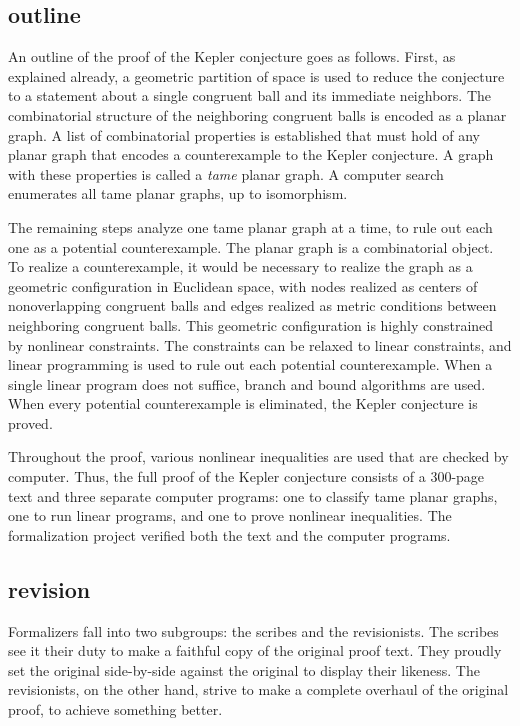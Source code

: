 \documentclass{amsart}
\begin{document}
\subsection{outline}

An outline of the proof of the Kepler conjecture goes as follows.
First, as explained already, a geometric partition of space is used to
reduce the conjecture to a statement about a single congruent ball and its
immediate neighbors.  The combinatorial structure of the neighboring
congruent balls is encoded as a planar graph.  A list of combinatorial
properties is established that must hold of any planar graph that
encodes a counterexample to the Kepler conjecture.  A graph with these
properties is called a \emph{tame} planar graph.  A computer search
enumerates all tame planar graphs, up to isomorphism.

The remaining steps analyze one tame planar graph at a time, to rule
out each one as a potential counterexample.  The planar graph is a
combinatorial object.  To realize a counterexample, it would be
necessary to realize the graph as a geometric configuration in
Euclidean space, with nodes realized as centers of nonoverlapping
congruent balls and edges realized as metric conditions between neighboring
congruent balls.  This geometric configuration is highly constrained by
nonlinear constraints.  The constraints can be relaxed to linear
constraints, and linear programming is used to rule out each potential
counterexample.  When a single linear program does not suffice, branch
and bound algorithms are used.  When every potential counterexample is eliminated,
the Kepler conjecture is proved.

Throughout the proof, various nonlinear inequalities are used that are
checked by computer.  Thus, the full proof of the Kepler
conjecture consists of a 300-page text and three separate computer
programs: one to classify tame planar graphs, one to run linear
programs, and one to prove nonlinear inequalities.  The formalization
project verified both the text and the computer programs.

\subsection{revision}

Formalizers fall into two subgroups: the scribes and the revisionists.
The scribes see it their duty to make a faithful copy of the original
proof text.  They proudly set the original side-by-side against the
original to display their likeness. The revisionists, on the other
hand, strive to make a complete overhaul of the original proof, to
achieve something better.
\end{document}
